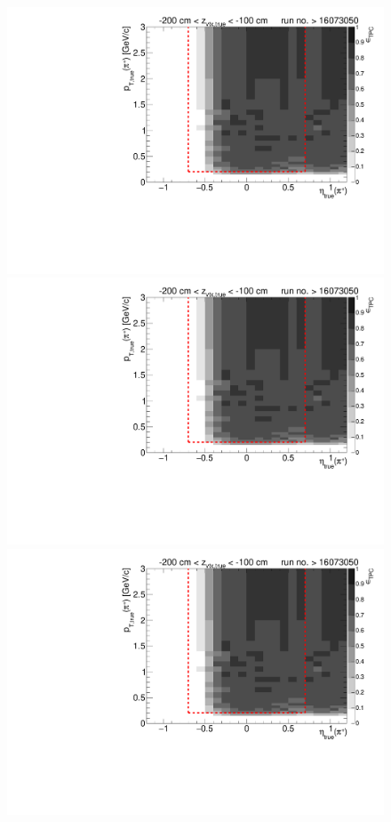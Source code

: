 \begin{figure}[hb]
{		\includegraphics[width=\linewidth,page=6]{graphics/eff/Eff2D_TPC_pion_Plus_RunRange2.pdf}\\
		\includegraphics[width=\linewidth,page=8]{graphics/eff/Eff2D_TPC_pion_Plus_RunRange2.pdf}\\
		\includegraphics[width=\linewidth,page=10]{graphics/eff/Eff2D_TPC_pion_Plus_RunRange2.pdf}
	}%
\end{figure}
